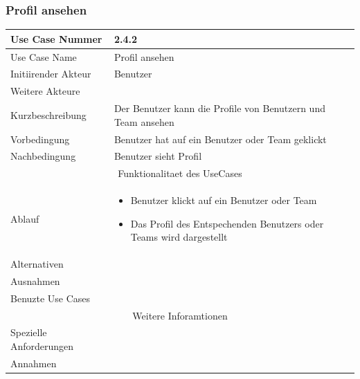 \documentclass[10pt,a4paper]{article}
\begin{document}
\subsubsection{Profil ansehen}
		\begin{tabular}{|l|p{.5\linewidth}|}
		\hline Use Case Nummer & 2.4.2 \\ 
		\hline Use Case Name & Profil ansehen \\ 
		\hline Initiirender Akteur & Benutzer \\
		\hline Weitere Akteure &  \\
		\hline Kurzbeschreibung & Der Benutzer kann die Profile von Benutzern und Team ansehen \\
		\hline Vorbedingung & Benutzer hat auf ein Benutzer oder Team geklickt \\
		\hline Nachbedingung & Benutzer sieht Profil \\
		\hline \multicolumn{2}{|c|}{Funktionalitaet des UseCases}\\
		\hline Ablauf & \begin{itemize}
			\item Benutzer klickt auf ein Benutzer oder Team
			\item Das Profil des Entspechenden Benutzers oder Teams wird dargestellt
		\end{itemize} \\
		\hline Alternativen &  \\
		\hline Ausnahmen &  \\
		\hline Benuzte Use Cases &  \\
		\hline \multicolumn{2}{|c|}{Weitere Inforamtionen} \\
		\hline Spezielle Anforderungen &  \\
		\hline Annahmen &  \\
		\hline
		\end{tabular}
\end{document}
